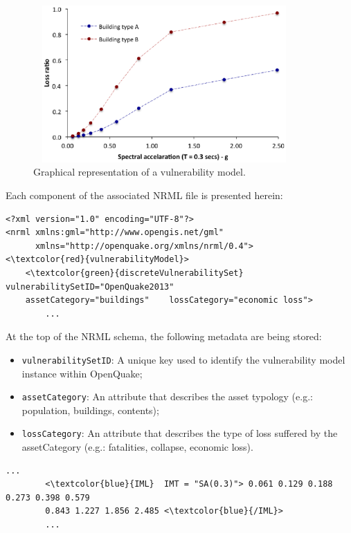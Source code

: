 \begin{figure}[ht]
\centering
\includegraphics[width=10cm,height=6cm]{./figures/risk/vulnerabilityModel.eps}
\caption{Graphical representation of a vulnerability model.}
\label{fig:vulModel}
\end{figure}

Each component of the associated NRML file is presented herein:
 
\begin{Verbatim}[frame=single, commandchars=\\\{\}, samepage=true]
<?xml version="1.0" encoding="UTF-8"?>
<nrml xmlns:gml="http://www.opengis.net/gml"
      xmlns="http://openquake.org/xmlns/nrml/0.4">
<\textcolor{red}{vulnerabilityModel}>
    <\textcolor{green}{discreteVulnerabilitySet} vulnerabilitySetID="OpenQuake2013"	
    assetCategory="buildings"    lossCategory="economic loss">
        ...
\end{Verbatim}

At the top of the NRML schema, the following metadata are being stored:
\begin{itemize}
\item  \Verb+vulnerabilitySetID+: A unique key used to identify the vulnerability model instance within OpenQuake;
\item  \Verb+assetCategory+: An attribute that describes the asset typology (e.g.: population, buildings, contents);
\item  \Verb+lossCategory+: An attribute that describes the type of loss suffered by the assetCategory (e.g.: fatalities, collapse, economic loss). 
\end{itemize}

\begin{Verbatim}[frame=single, commandchars=\\\{\}, samepage=true]
    ...
        <\textcolor{blue}{IML}  IMT = "SA(0.3)"> 0.061 0.129 0.188 0.273 0.398 0.579 
        0.843 1.227 1.856 2.485 <\textcolor{blue}{/IML}>
        ...
\end{Verbatim}

